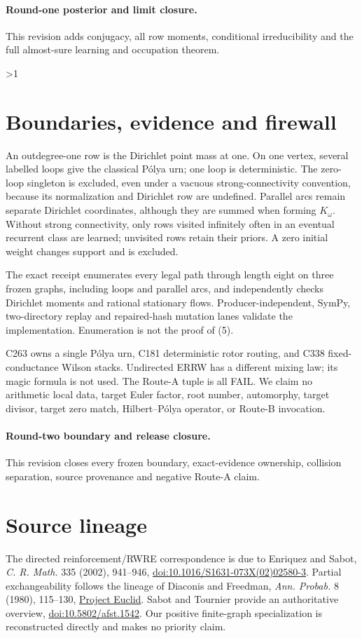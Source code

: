 \documentclass[10pt]{article}
\providecommand{\CRevisionRound}{2}
\begin{document}
\paragraph{Round-one posterior and limit closure.}
This revision adds conjugacy, all row moments, conditional irreducibility and
the full almost-sure learning and occupation theorem.
\fi

\ifnum\CRevisionRound>1
\section{Boundaries, evidence and firewall}
An outdegree-one row is the Dirichlet point mass at one. On one vertex,
several labelled loops give the classical Pólya urn; one loop is deterministic.
The zero-loop singleton is excluded, even under a vacuous strong-connectivity
convention, because its normalization and Dirichlet row are undefined.
Parallel arcs remain separate Dirichlet coordinates, although they are summed
when forming $K_\omega$.  Without strong connectivity, only rows visited
infinitely often in an eventual recurrent class are learned; unvisited rows
retain their priors.  A zero initial weight changes support and is excluded.

The exact receipt enumerates every legal path through length eight on three
frozen graphs, including loops and parallel arcs, and independently checks
Dirichlet moments and rational stationary flows.  Producer-independent,
SymPy, two-directory replay and repaired-hash mutation lanes validate the
implementation.  Enumeration is not the proof of (5).

C263 owns a single Pólya urn, C181 deterministic rotor routing, and C338
fixed-conductance Wilson stacks.  Undirected ERRW has a different mixing law;
its magic formula is not used.  The Route-A tuple is all FAIL.  We claim no
arithmetic local data, target Euler factor, root number, automorphy, target
divisor, target zero match, Hilbert--Pólya operator, or Route-B invocation.

\paragraph{Round-two boundary and release closure.}
This revision closes every frozen boundary, exact-evidence ownership, collision
separation, source provenance and negative Route-A claim.
\fi

\section{Source lineage}
The directed reinforcement/RWRE correspondence is due to Enriquez and Sabot,
\emph{C. R. Math.} 335 (2002), 941--946,
\href{https://doi.org/10.1016/S1631-073X(02)02580-3}{doi:10.1016/S1631-073X(02)02580-3}.
Partial exchangeability follows the lineage of Diaconis and Freedman,
\emph{Ann. Probab.} 8 (1980), 115--130,
\href{https://projecteuclid.org/euclid.aop/1176994828}{Project Euclid}.
Sabot and Tournier provide an authoritative overview,
\href{https://doi.org/10.5802/afst.1542}{doi:10.5802/afst.1542}.
Our positive finite-graph specialization is reconstructed directly and makes
no priority claim.
\end{document}
